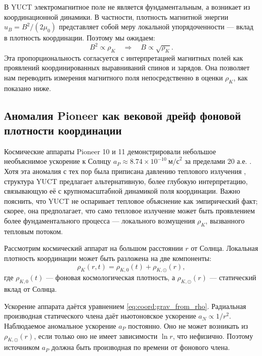 \documentclass[12pt,a4paper]{article}
\theoremstyle{remark}
\begin{document}
	В YUCT электромагнитное поле не является фундаментальным, а возникает из координационной динамики. В частности, плотность магнитной энергии $u_B = B^2/(2\mu_0)$ представляет собой меру локальной упорядоченности — вклад в плотность координации. Поэтому мы ожидаем:
	\begin{equation}
		B^2 \propto \rho_K \quad \Longrightarrow \quad B \propto \sqrt{\rho_K}.
		\label{eq:coord:B_rho}
	\end{equation}
	Эта пропорциональность согласуется с интерпретацией магнитных полей как проявлений координированных выравниваний спинов и зарядов. Она позволяет нам переводить измерения магнитного поля непосредственно в оценки $\rho_K$, как показано ниже.
	
	\subsection{Аномалия Pioneer как вековой дрейф фоновой плотности координации}
	\label{subsec:coord:pioneer}
	
	Космические аппараты Pioneer 10 и 11 демонстрировали небольшое необъяснимое ускорение к Солнцу $a_P \approx 8.74 \times 10^{-10}\ \text{м/с}^2$ за пределами 20 а.е. \cite{Anderson1998}. Хотя эта аномалия с тех пор была приписана давлению теплового излучения \cite{Turyshev2012}, структура YUCT предлагает альтернативную, более глубокую интерпретацию, связывающую её с крупномасштабной динамикой поля координации. Важно пояснить, что YUCT не оспаривает тепловое объяснение как эмпирический факт; скорее, она предполагает, что само тепловое излучение может быть проявлением более фундаментального процесса — локального возмущения $\rho_K$, вызванного тепловым потоком.
	
	Рассмотрим космический аппарат на большом расстоянии $r$ от Солнца. Локальная плотность координации может быть разложена на две компоненты:
	\begin{equation}
		\rho_K(r,t) = \rho_{K,0}(t) + \rho_{K,\odot}(r),
		\label{eq:coord:rho_decomp}
	\end{equation}
	где $\rho_{K,0}(t)$ — фоновая космологическая плотность, а $\rho_{K,\odot}(r)$ — статический вклад от Солнца.
	
	Ускорение аппарата даётся уравнением \eqref{eq:coord:grav_from_rho}. Радиальная производная статического члена даёт ньютоновское ускорение $a_N \propto 1/r^2$. Наблюдаемое аномальное ускорение $a_P$ постоянно. Оно не может возникать из $\rho_{K,\odot}(r)$, если только оно не имеет зависимости $\ln r$, что нефизично. Поэтому источником $a_P$ должна быть производная по времени от фонового члена.
	
\end{document}
